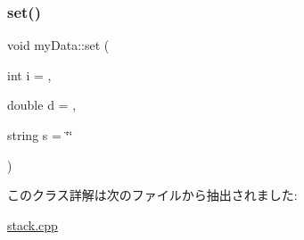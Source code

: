 \subsubsection{\texorpdfstring{set()}{set()}}
{\footnotesize\ttfamily void my\+Data\+::set (\begin{DoxyParamCaption}\item[{int}]{i = {},  }\item[{double}]{d = {},  }\item[{string}]{s = {\ttfamily \char`\"{}\char`\"{}} }\end{DoxyParamCaption})\hspace{0.3cm}{\ttfamily [inline]}}



このクラス詳解は次のファイルから抽出されました\+:\begin{DoxyCompactItemize}
\item 
\hyperlink{stack_8cpp}{stack.\+cpp}\end{DoxyCompactItemize}
